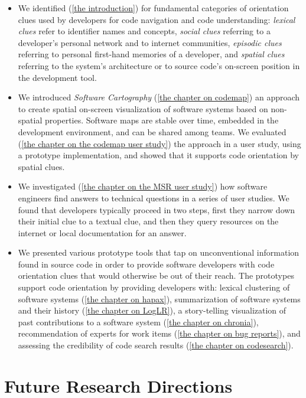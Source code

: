 \begin{itemize}
\item We identified (\autoref{the introduction}) for fundamental categories of orientation clues used by developers for code navigation and code understanding: \emph{lexical clues} refer to identifier names and concepts, \emph{social clues} referring to a developer's personal network and to internet communities, \emph{episodic clues} referring to personal first-hand memories of a developer, and \emph{spatial clues} referring to the system's architecture or to source code's on-screen position in the development tool.
\item We introduced \emph{Software Cartography} (\autoref{the chapter on codemap}) an approach to create spatial on-screen visualization of software systems based on non-spatial properties. Software maps are stable over time, embedded in the development environment, and can be shared among teams. We evaluated (\autoref{the chapter on the codemap user study}) the approach in a user study, using a prototype implementation, and showed that it supports code orientation by spatial clues.
\item We investigated (\autoref{the chapter on the MSR user study}) how software engineers find answers to technical questions in a series of user studies. We found that developers typically proceed in two steps, first they narrow down their initial clue to a textual clue, and then they query resources on the internet or local documentation for an answer.
\item We presented various prototype tools that tap on unconventional information found in source code in order to provide software developers with code orientation clues that would otherwise be out of their reach. The prototypes support code orientation by providing developers with: lexical clustering of software systems (\autoref{the chapter on hapax}), summarization of software systems and their history (\autoref{the chapter on LogLR}), a story-telling visualization of past contributions to a software system (\autoref{the chapter on chronia}), recommendation of experts for work items (\autoref{the chapter on bug reports}), and assessing the credibility of code search results (\autoref{the chapter on codesearch}).
\end{itemize} 

\section{Future Research Directions}

